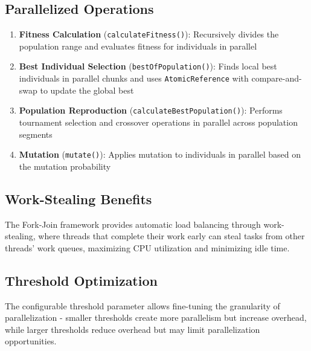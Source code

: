 \subsection{Parallelized Operations}

\begin{enumerate}
    \item \textbf{Fitness Calculation} (\texttt{calculateFitness()}):
    Recursively divides the population range and evaluates fitness for
    individuals in parallel
    \item \textbf{Best Individual Selection} (\texttt{bestOfPopulation()}):
    Finds local best individuals in parallel chunks and uses
    \texttt{AtomicReference} with compare-and-swap to update the global best
    \item \textbf{Population Reproduction} (\texttt{calculateBestPopulation()}):
    Performs tournament selection and crossover operations in parallel across
    population segments
    \item \textbf{Mutation} (\texttt{mutate()}): Applies mutation to individuals
    in parallel based on the mutation probability
\end{enumerate}

\subsection{Work-Stealing Benefits}
The Fork-Join framework provides automatic load balancing through work-stealing,
where threads that complete their work early can steal tasks from other threads'
work queues, maximizing CPU utilization and minimizing idle time.

\subsection{Threshold Optimization}
The configurable threshold parameter allows fine-tuning the granularity of
parallelization - smaller thresholds create more parallelism but increase
overhead, while larger thresholds reduce overhead but may limit parallelization
opportunities.